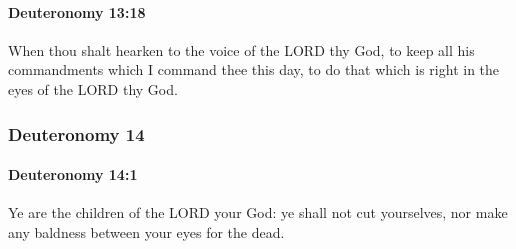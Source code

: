 		\paragraph{Deuteronomy 13:18} %
			\label{DEUTERONOMY-13-18}

			When thou shalt hearken to the voice of the LORD thy God, to keep all his commandments which I command thee this day, to do that which is right in the eyes of the LORD thy God.

	\subsubsection{Deuteronomy 14} %
		\label{DEUTERONOMY-14}

		\paragraph{Deuteronomy 14:1} %
			\label{DEUTERONOMY-14-1}

			Ye are the children of the LORD your God: ye shall not cut yourselves, nor make any baldness between your eyes for the dead.

